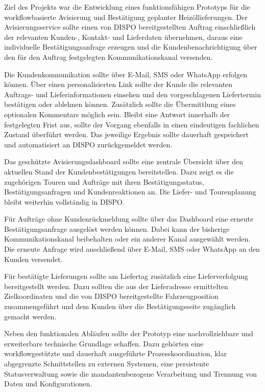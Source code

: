 Ziel des Projekts war die Entwicklung eines funktionsfähigen
Prototyps für die workflowbasierte Avisierung und
Bestätigung geplanter Heizöllieferungen. Der
Avisierungsservice sollte einen von DISPO bereitgestellten
Auftrag einschließlich der relevanten Kunden-, Kontakt- und
Lieferdaten übernehmen, daraus eine individuelle
Bestätigungsanfrage erzeugen und die Kundenbenachrichtigung über
den für den Auftrag festgelegten Kommunikationskanal versenden.

Die Kundenkommunikation sollte über E-Mail, SMS oder WhatsApp
erfolgen können. Über einen personalisierten Link sollte der
Kunde die relevanten Auftrags- und Lieferinformationen einsehen
und den vorgeschlagenen Liefertermin bestätigen oder ablehnen
können. Zusätzlich sollte die Übermittlung eines optionalen
Kommentars möglich sein. Bleibt eine Antwort innerhalb der
festgelegten Frist aus, sollte der Vorgang ebenfalls in einen
eindeutigen fachlichen Zustand überführt werden. Das jeweilige
Ergebnis sollte dauerhaft gespeichert und automatisiert an
DISPO zurückgemeldet werden.

Das geschützte Avisierungsdashboard sollte eine zentrale
Übersicht über den aktuellen Stand der Kundenbestätigungen
bereitstellen. Dazu zeigt es die zugehörigen Touren und
Aufträge mit ihren Bestätigungsstatus, Bestätigungsanfragen und
Kundenreaktionen an. Die Liefer- und Tourenplanung bleibt
weiterhin vollständig in DISPO.

Für Aufträge ohne Kundenrückmeldung sollte über das Dashboard
eine erneute Bestätigungsanfrage ausgelöst werden können. Dabei
kann der bisherige Kommunikationskanal beibehalten oder ein
anderer Kanal ausgewählt werden. Die erneute Anfrage wird
anschließend über E-Mail, SMS oder WhatsApp an den Kunden
versendet.

Für bestätigte Lieferungen sollte am Liefertag zusätzlich eine
Lieferverfolgung bereitgestellt werden. Dazu sollten die aus der
Lieferadresse ermittelten Zielkoordinaten und die von DISPO
bereitgestellte Fahrzeugposition zusammengeführt und dem Kunden
über die Bestätigungsseite zugänglich gemacht werden.

Neben den funktionalen Abläufen sollte der Prototyp eine
nachvollziehbare und erweiterbare technische Grundlage
schaffen. Dazu gehörten eine workflowgestützte und dauerhaft
ausgeführte Prozesskoordination, klar abgegrenzte Schnittstellen
zu externen Systemen, eine persistente Statusverwaltung sowie
die mandantenbezogene Verarbeitung und Trennung von Daten und
Konfigurationen.

